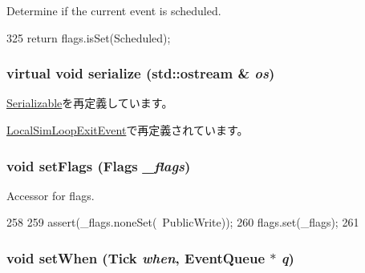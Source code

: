 Determine if the current event is scheduled. 


\begin{DoxyCode}
325 { return flags.isSet(Scheduled); }
\end{DoxyCode}
\hypertarget{classEvent_ad6272f80ae37e8331e3969b3f072a801}{
\subsubsection[{serialize}]{\setlength{\rightskip}{0pt plus 5cm}virtual void serialize (std::ostream \& {\em os})}}
\label{classEvent_ad6272f80ae37e8331e3969b3f072a801}


\hyperlink{classSerializable_ad6272f80ae37e8331e3969b3f072a801}{Serializable}を再定義しています。

\hyperlink{classLocalSimLoopExitEvent_ad6272f80ae37e8331e3969b3f072a801}{LocalSimLoopExitEvent}で再定義されています。\hypertarget{classEvent_a5e0b0810720dd9a6badbf966c410f723}{
\subsubsection[{setFlags}]{\setlength{\rightskip}{0pt plus 5cm}void setFlags ({\bf Flags} {\em \_\-flags})}}
\label{classEvent_a5e0b0810720dd9a6badbf966c410f723}


Accessor for flags. 


\begin{DoxyCode}
258     {
259         assert(_flags.noneSet(~PublicWrite));
260         flags.set(_flags);
261     }
\end{DoxyCode}
\hypertarget{classEvent_a55b61692e3efd22af1598cb1c721d70b}{
\subsubsection[{setWhen}]{\setlength{\rightskip}{0pt plus 5cm}void setWhen ({\bf Tick} {\em when}, \/  {\bf EventQueue} $\ast$ {\em q})}}
\label{classEvent_a55b61692e3efd22af1598cb1c721d70b}



